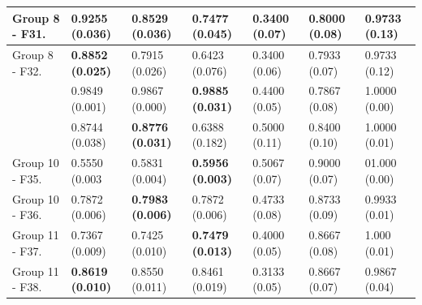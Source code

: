 \begin{center}
\begin{table}[!t]
\begin{tabular}{ccccccc}
		\multicolumn{1}{|l|}{Group 8 - F31.}           & \multicolumn{1}{l}{\textbf{0.9255 (0.036)}} & \multicolumn{1}{l}{0.8529 (0.036)} & \multicolumn{1}{l|}{0.7477 (0.045)}		& \multicolumn{1}{l}{0.3400 (0.07)} & \multicolumn{1}{l}{0.8000 (0.08)} & \multicolumn{1}{l|}{0.9733 (0.13)}  \\ \hline
		\multicolumn{1}{|l|}{Group 8 - F32.}              & \multicolumn{1}{l}{\textbf{0.8852 (0.025)}} & \multicolumn{1}{l}{0.7915 (0.026)} & \multicolumn{1}{l|}{0.6423 (0.076)}  		& \multicolumn{1}{l}{0.3400 (0.06)} & \multicolumn{1}{l}{0.7933 (0.07)} & \multicolumn{1}{l|}{0.9733 (0.12)}  \\ \hline
		\rowcolor[gray]{.85} \multicolumn{1}{|l|}{Group 9 - F33.}  & \multicolumn{1}{l}{0.9849 (0.001)} & \multicolumn{1}{l}{0.9867 (0.000)} & \multicolumn{1}{l|}{\textbf{0.9885 (0.031)}}  		& \multicolumn{1}{l}{0.4400 (0.05)} & \multicolumn{1}{l}{0.7867 (0.08)} & \multicolumn{1}{l|}{1.0000 (0.00)} \\ \hline
		 \rowcolor[gray]{.85} \multicolumn{1}{|l|}{Group 9 - F34.}              & \multicolumn{1}{l}{0.8744 (0.038)} & \multicolumn{1}{l}{\textbf{0.8776 (0.031)}} & \multicolumn{1}{l|}{0.6388 (0.182)}  		& \multicolumn{1}{l}{0.5000 (0.11)} & \multicolumn{1}{l}{0.8400 (0.10)} & \multicolumn{1}{l|}{1.0000 (0.01)}  \\ \hline
		\multicolumn{1}{|l|}{Group 10 - F35.}  & \multicolumn{1}{l}{0.5550 (0.003} & \multicolumn{1}{l}{0.5831 (0.004)} & \multicolumn{1}{l|}{\textbf{0.5956 (0.003)}}  		& \multicolumn{1}{l}{0.5067 (0.07)} & \multicolumn{1}{l}{0.9000 (0.07)} & \multicolumn{1}{l|}{01.000 (0.00)} \\ \hline
		  \multicolumn{1}{|l|}{Group 10 - F36.}              & \multicolumn{1}{l}{0.7872 (0.006)} & \multicolumn{1}{l}{\textbf{0.7983 (0.006)}} & \multicolumn{1}{l|}{0.7872 (0.006)}  		& \multicolumn{1}{l}{0.4733 (0.08)} & \multicolumn{1}{l}{0.8733 (0.09)} & \multicolumn{1}{l|}{0.9933 (0.01)}  \\ \hline
		\multicolumn{1}{|l|}{Group 11 - F37.}  & \multicolumn{1}{l}{0.7367 (0.009)} & \multicolumn{1}{l}{0.7425 (0.010)} & \multicolumn{1}{l|}{\textbf{0.7479 (0.013)}}  		& \multicolumn{1}{l}{0.4000 (0.05)} & \multicolumn{1}{l}{0.8667 (0.08)} & \multicolumn{1}{l|}{1.000 (0.01)} \\ \hline
		\multicolumn{1}{|l|}{Group 11 - F38.}              & \multicolumn{1}{l}{\textbf{0.8619 (0.010)}} & \multicolumn{1}{l}{0.8550 (0.011)} & \multicolumn{1}{l|}{0.8461 (0.019)}  		& \multicolumn{1}{l}{0.3133 (0.05)} & \multicolumn{1}{l}{0.8667 (0.07)} & \multicolumn{1}{l|}{0.9867 (0.04)}  \\ \hline

\end{tabular}
\end{table}
\end{center}
